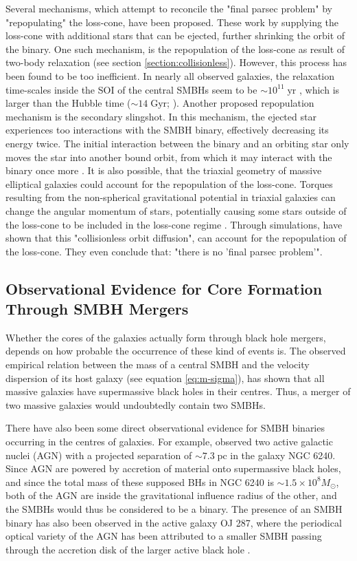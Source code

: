 \documentclass[english, twoside]{HYgradu}
\begin{document}
Several mechanisms, which attempt to reconcile the "final parsec problem" by "repopulating" the loss-cone, have been proposed. These work by supplying the loss-cone with additional stars that can be ejected, further shrinking the orbit of the binary. One such mechanism, is the repopulation of the loss-cone as result of two-body relaxation (see section \ref{section:collisionless}). However, this process has been found to be too inefficient. In nearly all observed galaxies, the relaxation time-scales inside the SOI of the central SMBHs seem to be $\sim 10^{11} \; \mathrm{yr}$ , which is larger than the Hubble time ($\sim 14 \; \mathrm{Gyr}$; \citealt{Faber1997, Milosavljevic2001}). Another proposed repopulation mechanism is the secondary slingshot. In this mechanism, the ejected star experiences too interactions with the SMBH binary, effectively decreasing its energy twice. The initial interaction between the binary and an orbiting star only moves the star into another bound orbit, from which it may interact with the binary once more \citep{MerrittBook}. It is also possible, that the triaxial geometry of massive elliptical galaxies could account for the repopulation of the loss-cone. Torques resulting from the non-spherical gravitational potential in triaxial galaxies can change the angular momentum of stars, potentially causing some stars outside of the loss-cone to be included in the loss-cone regime \citep{MerrittBook, Gualandris2017}. Through simulations, \cite{Gualandris2017} have shown that this "collisionless orbit diffusion", can account for the repopulation of the loss-cone. They even conclude that: "there is no 'final parsec problem'".

\subsection{Observational Evidence for Core Formation Through SMBH Mergers}

Whether the cores of the galaxies actually form through black hole mergers, depends on how probable the occurrence of these kind of events is. The observed empirical relation between the mass of a central SMBH and the velocity dispersion of its host galaxy (see equation \ref{eq:m-sigma}), has shown that all massive galaxies have supermassive black holes in their centres. Thus, a merger of two massive galaxies would undoubtedly contain two SMBHs. 

There have also been some direct observational evidence for SMBH binaries occurring in the centres of galaxies. For example, \cite{Rodriguez2006} observed two active galactic nuclei (AGN) with a projected separation of $\sim 7.3 \; \mathrm{pc}$ in the galaxy NGC 6240. Since AGN are powered by accretion of material onto supermassive black holes, and since the total mass of these supposed BHs in NGC 6240 is $\sim 1.5 \times 10^8 M_\odot$, both of the AGN are inside the gravitational influence radius of the other, and the SMBHs would thus be considered to be a binary. The presence of an SMBH binary has also been observed in the active galaxy OJ 287, where the periodical optical variety of the AGN has been attributed to a smaller SMBH passing through the accretion disk of the larger active black hole \citep{MerrittBook}.
\end{document}
